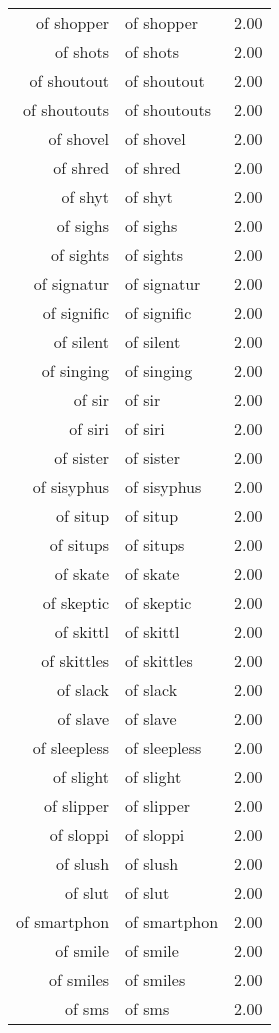 \begin{table}[ht]
\begin{tabular}{rlr}
  of shopper & of shopper & 2.00 \\ 
  of shots & of shots & 2.00 \\ 
  of shoutout & of shoutout & 2.00 \\ 
  of shoutouts & of shoutouts & 2.00 \\ 
  of shovel & of shovel & 2.00 \\ 
  of shred & of shred & 2.00 \\ 
  of shyt & of shyt & 2.00 \\ 
  of sighs & of sighs & 2.00 \\ 
  of sights & of sights & 2.00 \\ 
  of signatur & of signatur & 2.00 \\ 
  of signific & of signific & 2.00 \\ 
  of silent & of silent & 2.00 \\ 
  of singing & of singing & 2.00 \\ 
  of sir & of sir & 2.00 \\ 
  of siri & of siri & 2.00 \\ 
  of sister & of sister & 2.00 \\ 
  of sisyphus & of sisyphus & 2.00 \\ 
  of situp & of situp & 2.00 \\ 
  of situps & of situps & 2.00 \\ 
  of skate & of skate & 2.00 \\ 
  of skeptic & of skeptic & 2.00 \\ 
  of skittl & of skittl & 2.00 \\ 
  of skittles & of skittles & 2.00 \\ 
  of slack & of slack & 2.00 \\ 
  of slave & of slave & 2.00 \\ 
  of sleepless & of sleepless & 2.00 \\ 
  of slight & of slight & 2.00 \\ 
  of slipper & of slipper & 2.00 \\ 
  of sloppi & of sloppi & 2.00 \\ 
  of slush & of slush & 2.00 \\ 
  of slut & of slut & 2.00 \\ 
  of smartphon & of smartphon & 2.00 \\ 
  of smile & of smile & 2.00 \\ 
  of smiles & of smiles & 2.00 \\ 
  of sms & of sms & 2.00 \\ 

\end{tabular}
\end{table}
